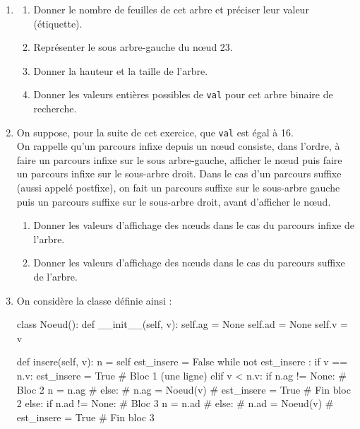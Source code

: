 \documentclass[a4paper,12pt,french]{book}
\begin{document}
\begin{enumerate}[\bfseries 1.]
	\item \begin{enumerate}[\bfseries a.]
    	\item Donner le nombre de feuilles de cet arbre et préciser leur valeur (étiquette).
    	
        \item Représenter le sous arbre-gauche du nœud 23.
        \item Donner la hauteur et la taille de l’arbre.
        \item Donner les valeurs entières possibles de \texttt{val} pour cet arbre binaire de recherche.
    \end{enumerate}


    \item On suppose, pour la suite de cet exercice, que \texttt{val} est égal à 16.\\

        On rappelle qu’un parcours infixe depuis un nœud consiste, dans l’ordre, à faire un parcours infixe sur le sous arbre-gauche, afficher le nœud puis faire un parcours infixe sur le sous-arbre droit.
        Dans le cas d’un parcours suffixe (aussi appelé postfixe), on fait un parcours suffixe sur le sous-arbre gauche puis un parcours suffixe sur le sous-arbre droit, avant d’afficher le nœud.\\

            \begin{enumerate}[\bfseries a.]
            	\item Donner les valeurs d’affichage des nœuds dans le cas du parcours infixe de l’arbre.
                \item Donner les valeurs d’affichage des nœuds dans le cas du parcours suffixe de l’arbre.
            \end{enumerate}
\newpage
      \item On considère la classe  définie ainsi :

\begin{pythoncode}
class Noeud():
    def __init__(self, v):
        self.ag = None
        self.ad = None
        self.v = v

    def insere(self, v):
        n = self
        est_insere = False
        while not est_insere :
            if v == n.v:
                est_insere = True       # Bloc 1 (une ligne)
            elif v < n.v:
                if n.ag != None:        # Bloc 2
                    n = n.ag            #
                else:                   #
                    n.ag = Noeud(v)     #
                    est_insere = True   # Fin bloc 2
            else:
                if n.ad != None:        # Bloc 3
                    n = n.ad            #
                else:                   #
                    n.ad = Noeud(v)     #
                    est_insere = True   # Fin bloc 3


\end{pythoncode}
\end{enumerate}
\end{document}
